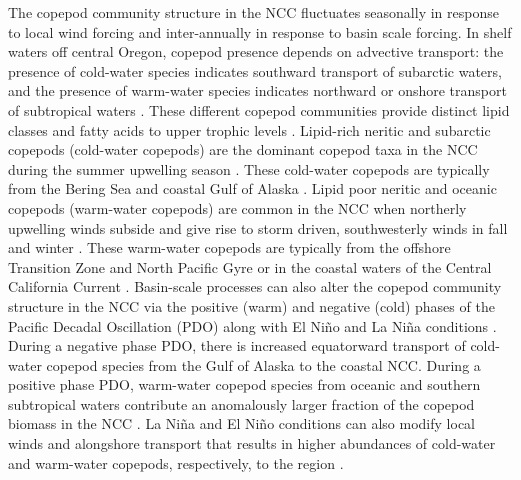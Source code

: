 \documentclass[preprint, authoryear, 12pt]{elsarticle}
\begin{document}
The copepod community structure in the NCC fluctuates seasonally in response to local wind forcing and inter-annually in response to basin scale forcing. In shelf waters off central Oregon, copepod presence depends on advective transport: the presence of cold-water species indicates southward transport of subarctic waters, and the presence of warm-water species indicates northward or onshore transport of subtropical waters \citep{keister2011zooplankton}.   These different copepod communities provide distinct lipid classes and fatty acids to upper trophic levels \citep{miller2017temporal}. Lipid-rich neritic and subarctic copepods (cold-water copepods) are the dominant copepod taxa in the NCC during the summer upwelling season \citep{peterson2003interannual, hooff2006copepod, mackas2006zooplankton}. These cold-water copepods are typically from the Bering Sea and coastal Gulf of Alaska  \citep{cooney2001seasonality, mackas2001changes}. Lipid poor neritic and oceanic copepods (warm-water copepods) are common in the NCC when northerly upwelling winds subside and give rise to storm driven, southwesterly winds in fall and winter \citep{peterson1977seasonal}. These warm-water copepods are typically from the offshore Transition Zone and North Pacific Gyre or in the coastal waters of the Central California Current \citep{peterson1977seasonal}.  Basin-scale processes can also alter the copepod community structure in the NCC via the positive (warm) and negative (cold) phases of the Pacific Decadal Oscillation (PDO) along with El Niño and La Niña conditions \citep{peterson2003interannual, hooff2006copepod, mackas2006zooplankton, peterson2014applied, fisher2015impact, peterson2017pelagic}. During a negative phase PDO, there is increased equatorward transport of cold-water copepod species from the Gulf of Alaska to the coastal NCC. During a positive phase PDO, warm-water copepod species from oceanic and southern subtropical waters contribute an anomalously larger fraction of the copepod biomass in the NCC \citep{bi2011transport, keister2011zooplankton}. La Niña and El Niño conditions can also modify local winds and alongshore transport that results in higher abundances of cold-water and warm-water copepods, respectively, to the region \citep{fisher2015impact}.
\end{document}
